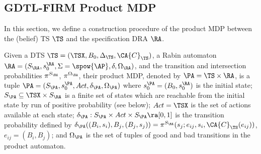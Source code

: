 \subsection{GDTL-FIRM Product MDP}

In this section, we define a construction procedure of
the product MDP between the (belief) TS $\TS$ and
the specification DRA $\RA$.

\begin{definition}
\label{def:pa}
Given a DTS $\TS = (\TSX, B_0, \Delta_\TS, \CA{C}_\TS)$,
a Rabin automaton $\RA = (S_\RA, s_0^\RA, \Sigma=\spow{\AP}, \delta, \Omega_\RA)$,
and the transition and intersection probabilities $\pi^{S_\RA}$, $\pi^{\Omega_\RA}$,
their product MDP, denoted by $\PA = \TS \times \RA$, is a tuple
$\PA = (S_\PA, s_0^\PA, Act, \delta_\PA, \Omega_\PA)$ where %
$s_0^\PA = (B_0 , s_0^\RA)$ is the initial state;
$S_\PA \subseteq \TSX \times S_\RA $ is a finite set of states
which are reachable from the initial state by run of positive probability (see below);
$Act = \TSX$ is the set of actions available at each state;
$\delta_\PA : S_\PA \times Act \times S_\PA \ra [0, 1]$ is the transition probability
defined by $\delta_\PA((B_i, s_i), B_j, (B_j, s_j)) = \pi^{S_\RA}(s_j ; e_{ij}, s_i, \CA{C}_\TS(e_{ij}))$, $e_{ij} = (B_i, B_j)$;
and $\Omega_\PA$ is the set of tuples of good and bad transitions in the product automaton.

\end{definition}


